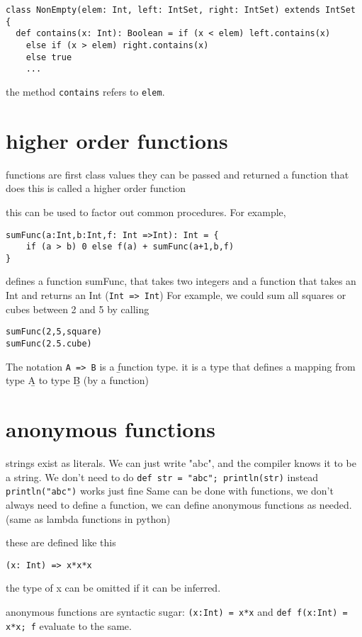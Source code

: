 \begin{lstlisting}
class NonEmpty(elem: Int, left: IntSet, right: IntSet) extends IntSet {
  def contains(x: Int): Boolean = if (x < elem) left.contains(x)
    else if (x > elem) right.contains(x)
    else true
    ...
\end{lstlisting}
the method \lstinline{contains} refers to \lstinline{elem}.

\section{higher order functions}
functions are first class values
they can be passed and returned
a function that does this is called a higher order function

this can be used to factor out common procedures. For example, 
\begin{lstlisting}
sumFunc(a:Int,b:Int,f: Int =>Int): Int = {
    if (a > b) 0 else f(a) + sumFunc(a+1,b,f)
}
\end{lstlisting}

defines a function sumFunc, that takes two integers and a function that takes an Int and returns an Int (\lstinline{Int => Int})
For example, we could sum all squares or cubes between 2 and 5 by calling
\begin{lstlisting}
sumFunc(2,5,square)
sumFunc(2.5.cube)
\end{lstlisting}
The notation \lstinline{A => B} is  a {\b function type}. it is a type that defines a mapping from type {\b A} to type {\b B} (by a function)

\section{anonymous functions}
strings exist as literals. We can just write "abc", and the compiler knows it to be a string. We don't need to do \lstinline{def str = "abc"; println(str)}
instead \lstinline|println("abc")| works just fine
Same can be done with functions, we don't always need to define a function, we can define anonymous functions as needed. (same as lambda functions in python)

these are defined like this
\begin{lstlisting}
(x: Int) => x*x*x
\end{lstlisting}
the type of x can be omitted if it can be inferred.

anonymous functions are syntactic sugar:
\lstinline{(x:Int) = x*x} and \lstinline{def f(x:Int) = x*x; f} 
evaluate to the same.

